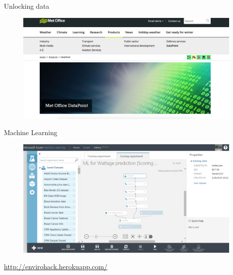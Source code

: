 \documentclass[15pt]{beamer}
\begin{document}
\begin{frame}{Unlocking data}
	\begin{figure}
		\centering
		\includegraphics[width=1.0\textwidth]{pic/dataPoint.jpg}
	\end{figure}

\end{frame}

\begin{frame}{Machine Learning}
	\begin{figure}
		\centering
		\includegraphics[width=1.0\textwidth]{pic/MLmodel.png}
	\end{figure}
	
	\url{http://envirohack.herokuapp.com/}
\end{frame}
\end{document}
